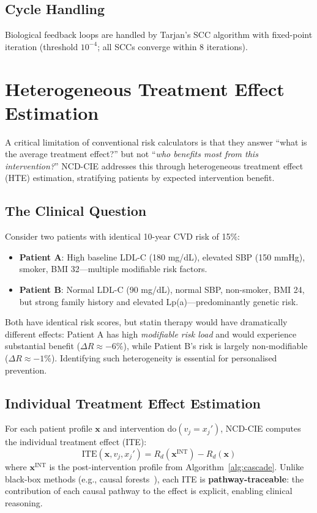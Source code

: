 \documentclass[runningheads]{llncs}
\begin{document}
\subsection{Cycle Handling}\label{sec:cycles}

Biological feedback loops are handled by Tarjan's SCC algorithm
with fixed-point iteration (threshold $10^{-4}$; all SCCs converge
within 8 iterations).

\section{Heterogeneous Treatment Effect Estimation}\label{sec:hte}

A critical limitation of conventional risk calculators is that they
answer ``what is the average treatment effect?'' but not
``\emph{who benefits most from this intervention?}''
NCD-CIE addresses this through heterogeneous treatment effect (HTE)
estimation, stratifying patients by expected intervention benefit.

\subsection{The Clinical Question}

Consider two patients with identical 10-year CVD risk of 15\%:
\begin{itemize}
\item \textbf{Patient A}: High baseline LDL-C (180 mg/dL), elevated
  SBP (150 mmHg), smoker, BMI 32---multiple modifiable risk factors.
\item \textbf{Patient B}: Normal LDL-C (90 mg/dL), normal SBP,
  non-smoker, BMI 24, but strong family history and elevated Lp(a)---predominantly
  genetic risk.
\end{itemize}
Both have identical risk scores, but statin therapy would have
dramatically different effects: Patient A has high \emph{modifiable
risk load} and would experience substantial benefit ($\Delta R \approx -6\%$),
while Patient B's risk is largely non-modifiable ($\Delta R \approx -1\%$).
Identifying such heterogeneity is essential for personalised prevention.

\subsection{Individual Treatment Effect Estimation}\label{sec:ite}

For each patient profile $\mathbf{x}$ and intervention
$\mathrm{do}(v_j = x_j')$, NCD-CIE computes the individual treatment
effect (ITE):
\begin{equation}\label{eq:ite}
\mathrm{ITE}(\mathbf{x}, v_j, x_j') = R_d(\mathbf{x}^{\mathrm{INT}}) - R_d(\mathbf{x})
\end{equation}
where $\mathbf{x}^{\mathrm{INT}}$ is the post-intervention profile
from Algorithm~\ref{alg:cascade}.
Unlike black-box methods (e.g., causal forests~\cite{inoue2023causalforest,mori2026sglt2i}),
each ITE is \textbf{pathway-traceable}: the contribution of each
causal pathway to the effect is explicit, enabling clinical reasoning.
\end{document}
